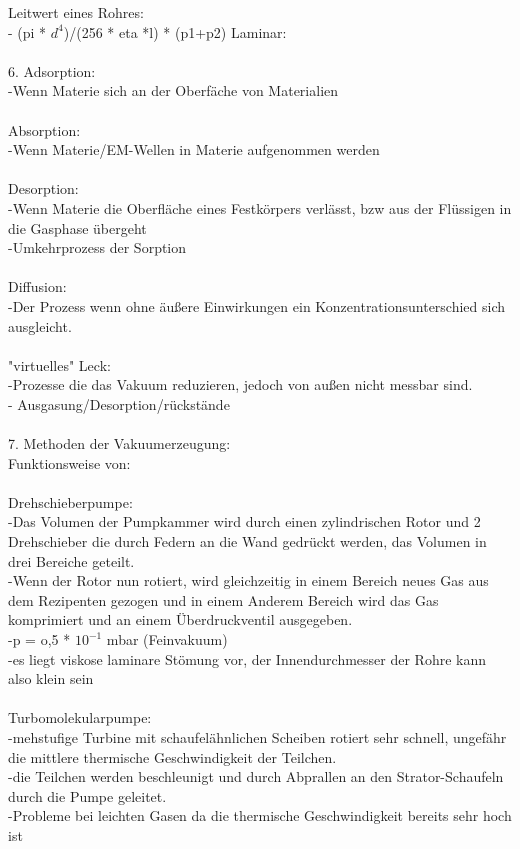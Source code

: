 	   Leitwert eines Rohres:\\
		- (pi * $d^4$)/(256 * eta *l) * (p1+p2) Laminar:\\
\\
	6. Adsorption:\\
		-Wenn Materie sich an der Oberfäche von Materialien \\ 
\\
	   Absorption:\\
		-Wenn Materie/EM-Wellen in Materie aufgenommen werden\\
\\
	   Desorption:\\
		-Wenn Materie die Oberfläche eines Festkörpers verlässt, bzw aus der Flüssigen in die Gasphase übergeht\\
		-Umkehrprozess der Sorption\\
\\
	   Diffusion:\\
		-Der Prozess wenn ohne äußere Einwirkungen ein Konzentrationsunterschied sich ausgleicht.\\
		\\
	   "virtuelles" Leck:\\
	   	-Prozesse die das Vakuum reduzieren, jedoch von außen nicht messbar sind.\\
		- Ausgasung/Desorption/rückstände\\
\\
	7. Methoden der Vakuumerzeugung:\\
		Funktionsweise von:\\
\\
		Drehschieberpumpe:\\
			-Das Volumen der Pumpkammer wird durch einen zylindrischen Rotor und 2 Drehschieber die durch Federn an die Wand gedrückt werden, das Volumen in drei Bereiche geteilt. \\
			-Wenn der Rotor nun rotiert, wird gleichzeitig in einem Bereich neues Gas aus dem Rezipenten gezogen und in einem Anderem Bereich wird das Gas komprimiert und an einem Überdruckventil ausgegeben.\\
			-p = o,5 * $10^{-1}$ mbar (Feinvakuum)\\
			-es liegt viskose laminare Stömung vor, der Innendurchmesser der Rohre kann also klein sein\\
			\\
		Turbomolekularpumpe:\\
			-mehstufige Turbine mit schaufelähnlichen Scheiben rotiert sehr schnell, ungefähr die mittlere thermische Geschwindigkeit der Teilchen.\\
			-die Teilchen werden beschleunigt und durch Abprallen an den Strator-Schaufeln durch die Pumpe geleitet.\\
			-Probleme bei leichten Gasen da die thermische Geschwindigkeit bereits sehr hoch ist\\

